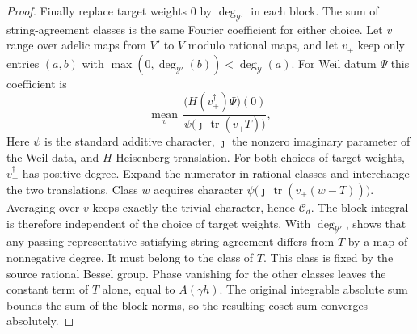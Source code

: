 \begin{proof}
Finally replace target weights $0$ by $\deg_{\mathcal Y'}$ in each block. The sum of string-agreement classes is the same Fourier coefficient for either choice. Let $v$ range over adelic maps from $V'$ to $V$ modulo rational maps, and let $v_+$ keep only entries $(a,b)$ with $\max(0,\deg_{\mathcal Y'}(b))<\deg_{\mathcal Y}(a)$. For Weil datum $\Psi$ this coefficient is
\[
 \operatorname*{mean}_{v}\,
   \frac{\bigl(H(v_+^\dagger)\Psi\bigr)(0)}
        {\psi\bigl(\jmath{}\,\operatorname{tr}(v_+T)\bigr)} ,
\]
Here $\psi$ is the standard additive character, $\jmath{}$ the nonzero imaginary parameter of the Weil data, and $H$ Heisenberg translation. For both choices of target weights, $v_+^\dagger$ has positive degree. Expand the numerator in rational classes and interchange the two translations. Class $w$ acquires character $\psi\bigl(\jmath{}\,\operatorname{tr}(v_+(w-T))\bigr)$. Averaging over $v$ keeps exactly the trivial character, hence $\mathcal C_d$. The block integral is therefore independent of the choice of target weights. With $\deg_{\mathcal Y'}$,  shows that any passing representative satisfying string agreement differs from $T$ by a map of nonnegative degree. It must belong to the class of $T$. This class is fixed by the source rational Bessel group. Phase vanishing for the other classes leaves the constant term of $T$ alone, equal to $A(\gamma h)$. The original integrable absolute sum bounds the sum of the block norms, so the resulting coset sum converges absolutely.
\end{proof}

